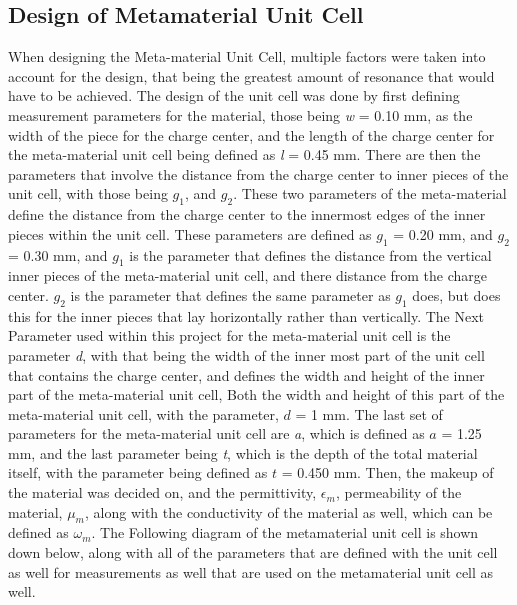 \documentclass[]{article}
\begin{document}
\subsection*{Design of Metamaterial Unit Cell}
When designing the Meta-material Unit Cell, multiple factors were taken into account for the design, that being the greatest amount of resonance that would have to be achieved. The design of the unit cell was done by first defining measurement parameters for the material, those being \textit{w} = 0.10 mm, as the width of the piece for the charge center, and the length of the charge center for the meta-material unit cell being defined as \textit{l} = 0.45 mm. There are then the parameters that involve the distance from the charge center to inner pieces of the unit cell, with those being $g_{1}$, and $g_{2}$. These two parameters of the meta-material define the distance from the charge center to the innermost edges of the inner pieces within the unit cell. These parameters are defined as $g_{1}$ = 0.20 mm, and $g_{2}$ = 0.30 mm, and $g_{1}$ is the parameter that defines the distance from the vertical inner pieces of the meta-material unit cell, and there distance from the charge center. $g_{2}$ is the parameter that defines the same parameter as $g_{1}$ does, but does this for the inner pieces that lay horizontally rather than vertically. The Next Parameter used within this project for the meta-material unit cell is the parameter \textit{d}, with that being the width of the inner most part of the unit cell that contains the charge center, and defines the width and height of the inner part of the meta-material unit cell, Both the width and height of this part of the meta-material unit cell, with the parameter, $d$ = 1 mm. The last set of parameters for the meta-material unit cell are \textit{a}, which is defined as $a$ = 1.25 mm, and the last parameter being \textit{t}, which is the depth of the total material itself, with the parameter being defined as $t$ = 0.450 mm. Then, the makeup of the material was decided on, and the permittivity, $\epsilon_m$, permeability of the material, $\mu_m$, along with the conductivity of the material as well,  which can be defined as $\omega_m$. The Following diagram of the metamaterial unit cell is shown down below, along with all of the parameters that are defined with the unit cell as well for measurements as well that are used on the metamaterial unit cell as well.
\end{document}
